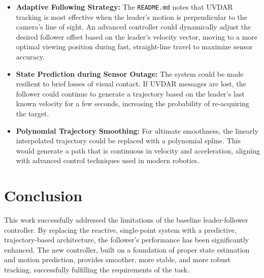 \documentclass[11pt, a4paper]{article}
\begin{document}
\begin{itemize}
    \item \textbf{Adaptive Following Strategy:} The \texttt{README.md} notes that UVDAR tracking is most effective when the leader's motion is perpendicular to the camera's line of sight. An advanced controller could dynamically adjust the desired follower offset based on the leader's velocity vector, moving to a more optimal viewing position during fast, straight-line travel to maximize sensor accuracy.
    
    \item \textbf{State Prediction during Sensor Outage:} The system could be made resilient to brief losses of visual contact. If UVDAR messages are lost, the follower could continue to generate a trajectory based on the leader's last known velocity for a few seconds, increasing the probability of re-acquiring the target.
    
    \item \textbf{Polynomial Trajectory Smoothing:} For ultimate smoothness, the linearly interpolated trajectory could be replaced with a polynomial spline. This would generate a path that is continuous in velocity and acceleration, aligning with advanced control techniques used in modern robotics.
\end{itemize}

\section{Conclusion}
This work successfully addressed the limitations of the baseline leader-follower controller. By replacing the reactive, single-point system with a predictive, trajectory-based architecture, the follower's performance has been significantly enhanced. The new controller, built on a foundation of proper state estimation and motion prediction, provides smoother, more stable, and more robust tracking, successfully fulfilling the requirements of the task.
\end{document}
